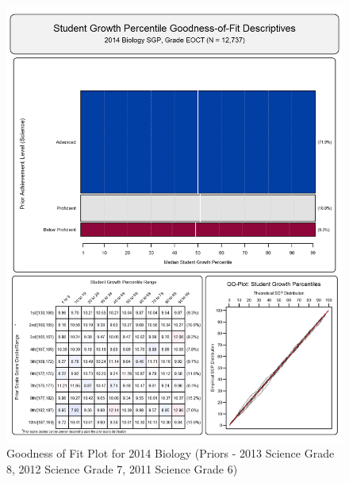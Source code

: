 \documentclass[12pt]{article}
\begin{document}
\begin{figure}[htbp]
\centering
\includegraphics{../img/Goodness_of_Fit/BIOLOGY.2014/2014_BIOLOGY_EOCT;2013_SCIENCE_8;2012_SCIENCE_7;2011_SCIENCE_6.png}
\caption{Goodness of Fit Plot for 2014 Biology (Priors - 2013 Science
Grade 8, 2012 Science Grade 7, 2011 Science Grade 6)}
\end{figure}
\end{document}
